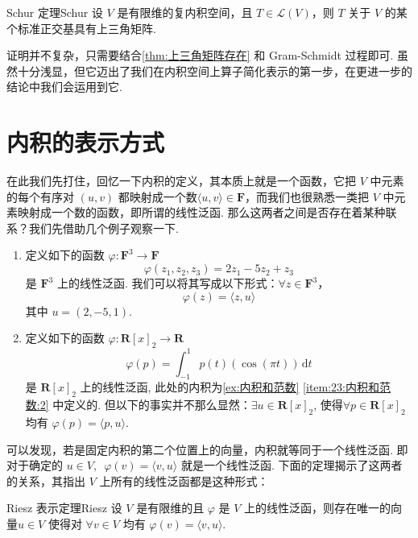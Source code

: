 \begin{theorem}{Schur 定理}{Schur} 
    设 $ V $ 是有限维的复内积空间，且 $ T \in \mathcal{L}(V) $，则 $ T $ 关于 $ V $ 的某个标准正交基具有上三角矩阵.
\end{theorem}

证明并不复杂，只需要结合\autoref{thm:上三角矩阵存在} 和 Gram-Schmidt 过程即可. 虽然十分浅显，但它迈出了我们在内积空间上算子简化表示的第一步，在更进一步的结论中我们会运用到它.

\section{内积的表示方式}

在此我们先打住，回忆一下内积的定义，其本质上就是一个函数，它把 $ V $ 中元素的每个有序对 $(u, v)$ 都映射成一个数$ \langle u, v \rangle \in \mathbf{F}$，而我们也很熟悉一类把 $ V $ 中元素映射成一个数的函数，即所谓的线性泛函. 那么这两者之间是否存在着某种联系？我们先借助几个例子观察一下.

\begin{example}{}{}
    \begin{enumerate}
        \item 定义如下的函数 $\varphi\colon \mathbf{F}^{3} \rightarrow \mathbf{F}$
              \[\varphi(z_1, z_2, z_3) = 2z_1 - 5z_2 + z_3\]
              是 $\mathbf{F}^{3}$ 上的线性泛函. 我们可以将其写成以下形式：$ \forall z \in \mathbf{F}^{3}$，
              \[\varphi(z) = \langle z, u\rangle\]
              其中 $u = (2, -5, 1)$.

        \item 定义如下的函数 $\varphi\colon \mathbf{R}[x]_2 \rightarrow \mathbf{R}$
              \[\varphi(p) = \int_{-1}^1 p(t)(\cos(\pi t))\,\mathrm{d}t\]
              是 $\mathbf{R}[x]_2$ 上的线性泛函, 此处的内积为\autoref{ex:内积和范数} \ref*{item:23:内积和范数:2} 中定义的. 但以下的事实并不那么显然：$ \exists u \in \mathbf{R}[x]_2$, 使得$\forall p \in \mathbf{R}[x]_2$ 均有 $ \varphi (p) = \langle p, u\rangle $.
    \end{enumerate}
\end{example}

可以发现，若是固定内积的第二个位置上的向量，内积就等同于一个线性泛函. 即对于确定的 $ u \in V , \enspace \varphi(v) = \langle v, u \rangle$ 就是一个线性泛函. 下面的定理揭示了这两者的关系，其指出 $ V $ 上所有的线性泛函都是这种形式：
\begin{theorem}{Riesz 表示定理}{Riesz} 
    设 $ V $ 是有限维的且 $ \varphi $ 是 $ V $ 上的线性泛函，则存在唯一的向量$u \in V$ 使得对 $\forall v \in V$ 均有 $ \varphi(v) = \langle v, u\rangle $.
\end{theorem}

